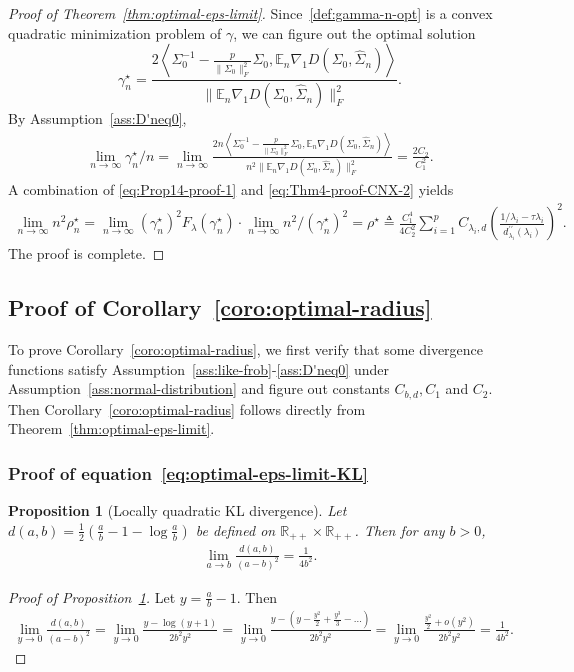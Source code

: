 \documentclass[11pt]{article}
\def\R{\mathbb{R}}
\def\la{\langle}
\def\ra{\rangle}
\newtheorem{proposition}{Proposition}
\newcommand{\bgeqn}{\begin{eqnarray}}
\newcommand{\edeqn}{\end{eqnarray}}
\newcommand{\opt}{^\star}
\newcommand{\Let}{\triangleq}
\def\R{\mathbb{R}}
\def\E {\mathbb{E}}
\def\la{\langle}
\def\ra{\rangle}
\newcommand{\wh}{\widehat}
\begin{document}
\begin{proof}[Proof of Theorem~\ref{thm:optimal-eps-limit}]
    Since~\eqref{def:gamma-n-opt} is a convex quadratic minimization problem of $\gamma$, we can figure out
    the optimal solution 
    \[
        \gamma\opt_n = \frac{2\left\la \Sigma_0^{-1}-\frac{p}{\|\Sigma_0\|_F^2}\Sigma_0, \E_n {\nabla_1 D }(\Sigma_0, \wh \Sigma_n)\right\ra}{\|\E_n {\nabla_1 D }(\Sigma_0, \wh \Sigma_n)\|_F^2}.
    \]
    By Assumption~\ref{ass:D'neq0},  
    \bgeqn 
       \label{eq:Thm4-proof-CNX-2}
        \lim_{n\to\infty} \gamma\opt_n/n = \lim_{n\to\infty} \frac{2n\left\la \Sigma_0^{-1}-\frac{p}{\|\Sigma_0\|_F^2}\Sigma_0, \E_n {\nabla_1 D }(\Sigma_0, \wh \Sigma_n)\right\ra}{n^2\|\E_n {\nabla_1 D }(\Sigma_0, \wh \Sigma_n)\|_F^2} = \frac{2C_2}{C_1^2}.
\edeqn 
    A combination of \eqref{eq:Prop14-proof-1} and \eqref{eq:Thm4-proof-CNX-2} yields
    \begin{align*}
        \lim_{n\to\infty} n^2  \rho_n\opt = \lim_{n\to\infty} (\gamma_n\opt)^2  F_{\lambda}(\gamma_n\opt)\cdot\lim_{n\to\infty} n^2/ (\gamma_n\opt)^2 =  \rho\opt \Let \frac{C_1^4}{4C_2^2} \sum_{i=1}^p C_{\lambda_i, d} \left(\frac{1/\lambda_i-\tau \lambda_i}{d_{\lambda_i}^{\prime\prime}(\lambda_i)} \right)^2.
    \end{align*}
    The proof is complete.
\end{proof}

\subsection{Proof of Corollary~\ref{coro:optimal-radius}}
To prove Corollary~\ref{coro:optimal-radius}, 
we first verify that some divergence functions satisfy Assumption~\ref{ass:like-frob}-\ref{ass:D'neq0} under Assumption~\ref{ass:normal-distribution} and figure out constants $C_{b,d}, C_1$ and $C_2$. Then Corollary~\ref{coro:optimal-radius} follows directly from Theorem~\ref{thm:optimal-eps-limit}. 

\subsubsection{Proof of equation~\eqref{eq:optimal-eps-limit-KL}}
\begin{proposition}[Locally quadratic KL divergence]\label{prop:KL-frob-like}
    Let $d(a,b)=\frac{1}{2}(\frac{a}{b}-1-\log\frac{a}{b})$ be defined on $\R_{++}\times \R_{++}$. Then for any $b>0$,  
    \bgeqn 
        \lim_{a\to b} \frac{d(a,b)}{(a-b)^2} = \frac{1}{4b^2}.
    \edeqn
\end{proposition}
\begin{proof}[Proof of Proposition~\ref{prop:KL-frob-like}]
    Let $y = \frac{a}{b}-1$. Then 
    \begin{align*}
        \lim_{y\to 0}\frac{d(a,b)}{(a-b)^2} = \lim_{y\to 0} \frac{y-\log(y+1)}{2b^2y^2} = \lim_{y\to 0} \frac{y-\left(y-\frac{y^2}{2}+\frac{y^3}{3}- \ldots \right)}{2b^2y^2} = \lim_{y\to 0} \frac{\frac{y^2}{2}+o(y^2)}{2b^2y^2}=\frac{1}{4b^2}.
    \end{align*}
\end{proof}
\end{document}
